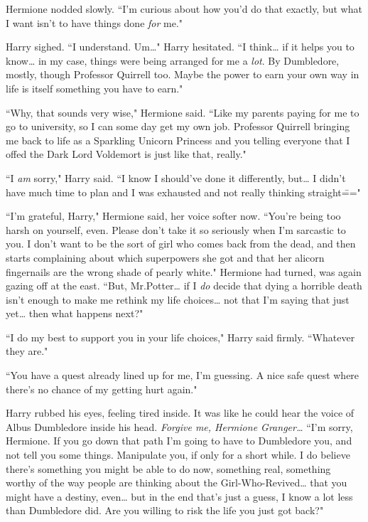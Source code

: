 Hermione nodded slowly. ``I'm curious about how you'd do that exactly, but what I want isn't to have things done \emph{for} me."

Harry sighed. ``I understand. Um{\ldots}" Harry hesitated. ``I think{\ldots} if it helps you to know{\ldots} in my case, things were being arranged for me a \emph{lot}. By Dumbledore, mostly, though Professor Quirrell too. Maybe the power to earn your own way in life is itself something you have to earn."

``Why, that sounds very wise," Hermione said. ``Like my parents paying for me to go to university, so I can some day get my own job. Professor Quirrell bringing me back to life as a Sparkling Unicorn Princess and you telling everyone that I offed the Dark Lord Voldemort is just like that, really."

``I \emph{am} sorry," Harry said. ``I know I should've done it differently, but{\ldots} I didn't have much time to plan and I was exhausted and not really thinking straight\==="

``I'm grateful, Harry," Hermione said, her voice softer now. ``You're being too harsh on yourself, even. Please don't take it so seriously when I'm sarcastic to you. I don't want to be the sort of girl who comes back from the dead, and then starts complaining about which superpowers she got and that her alicorn fingernails are the wrong shade of pearly white." Hermione had turned, was again gazing off at the east. ``But, Mr.\?Potter{\ldots} if I \emph{do} decide that dying a horrible death isn't enough to make me rethink my life choices{\ldots} not that I'm saying that just yet{\ldots} then what happens next?"

``I do my best to support you in your life choices," Harry said firmly. ``Whatever they are."

``You have a quest already lined up for me, I'm guessing. A nice safe quest where there's no chance of my getting hurt again."

Harry rubbed his eyes, feeling tired inside. It was like he could hear the voice of Albus Dumbledore inside his head. \emph{Forgive me, Hermione Granger{\ldots}} ``I'm sorry, Hermione. If you go down that path I'm going to have to Dumbledore you, and not tell you some things. Manipulate you, if only for a short while. I do believe there's something you might be able to do now, something real, something worthy of the way people are thinking about the Girl-Who-Revived{\ldots} that you might have a destiny, even{\ldots} but in the end that's just a guess, I know a lot less than Dumbledore did. Are you willing to risk the life you just got back?"

